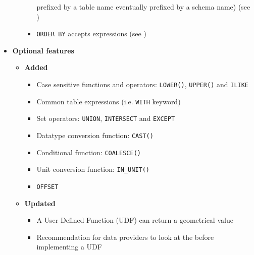 \documentclass[11pt,a4paper]{ivoa}
\begin{document}
\begin{itemize}
\begin{itemize}
\begin{itemize}
                          prefixed by a table name eventually prefixed by a
                          schema name)
                          (see )
                    \item \verb:ORDER BY: accepts expressions
                    (see )
                \end{itemize}
        \end{itemize}
    \item \textbf{Optional features}
        \begin{itemize}
            \item \textbf{Added}
                \begin{itemize}
                    \item Case sensitive functions and operators:
                          \verb:LOWER():, \verb:UPPER(): and \verb:ILIKE:
                    \item Common table expressions (i.e. \verb:WITH: keyword)
                    \item Set operators: \verb:UNION:, \verb:INTERSECT: and
                          \verb:EXCEPT: 
                    \item Datatype conversion function: \verb:CAST():
                    \item Conditional function: \verb:COALESCE():
                    \item Unit conversion function: \verb:IN_UNIT():
                    \item \verb:OFFSET:
                \end{itemize}
            \item \textbf{Updated}
                \begin{itemize}
                    \item A User Defined Function (UDF) can return a geometrical
                          value 
                    \item Recommendation for data providers to look at the
                          \CatalogueUDF{} before implementing a UDF

\end{itemize}
\end{itemize}
\end{itemize}
\end{document}
